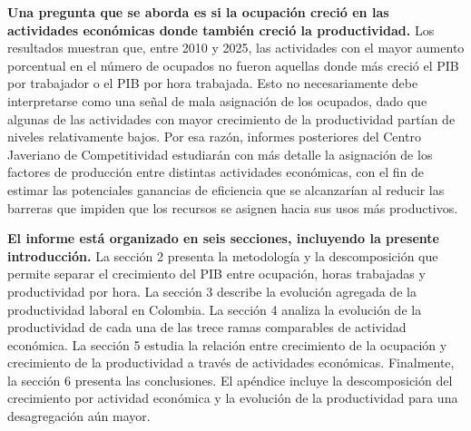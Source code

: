\textbf{Una pregunta que se aborda es si la ocupación creció en las actividades económicas donde también creció la productividad.} Los resultados muestran que, entre 2010 y 2025, las actividades con el mayor aumento porcentual en el número de ocupados no fueron aquellas donde más creció el PIB por trabajador o el PIB por hora trabajada. Esto no necesariamente debe interpretarse como una señal de mala asignación de los ocupados, dado que algunas de las actividades con mayor crecimiento de la productividad partían de niveles relativamente bajos. Por esa razón, informes posteriores del Centro Javeriano de Competitividad estudiarán con más detalle la asignación de los factores de producción entre distintas actividades económicas, con el fin de estimar las potenciales ganancias de eficiencia que se alcanzarían al reducir las barreras que impiden que los recursos se asignen hacia sus usos más productivos.

\textbf{El informe está organizado en seis secciones, incluyendo la presente introducción.} La sección 2 presenta la metodología y la descomposición que permite separar el crecimiento del PIB entre ocupación, horas trabajadas y productividad por hora. La sección 3 describe la evolución agregada de la productividad laboral en Colombia. La sección 4 analiza la evolución de la productividad de cada una de las trece ramas comparables de actividad económica. La sección 5 estudia la relación entre crecimiento de la ocupación y crecimiento de la productividad a través de actividades económicas. Finalmente, la sección 6 presenta las conclusiones. El apéndice incluye la descomposición del crecimiento por actividad económica y la evolución de la productividad para una desagregación aún mayor.

